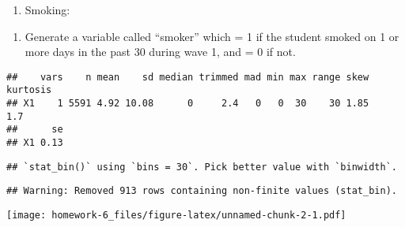\documentclass[]{article}
\newenvironment{Shaded}{\begin{snugshade}}{\end{snugshade}}
\newcommand{\DataTypeTok}[1]{\textcolor[rgb]{0.13,0.29,0.53}{#1}}
\newcommand{\KeywordTok}[1]{\textcolor[rgb]{0.13,0.29,0.53}{\textbf{#1}}}
\newcommand{\NormalTok}[1]{#1}
\newcommand{\OperatorTok}[1]{\textcolor[rgb]{0.81,0.36,0.00}{\textbf{#1}}}
\newcommand{\OtherTok}[1]{\textcolor[rgb]{0.56,0.35,0.01}{#1}}
\newcommand{\StringTok}[1]{\textcolor[rgb]{0.31,0.60,0.02}{#1}}
\providecommand{\tightlist}{%
  \setlength{\itemsep}{0pt}\setlength{\parskip}{0pt}}
\begin{document}
\begin{enumerate}
\def\labelenumi{\arabic{enumi})}
\setcounter{enumi}{2}
\tightlist
\item
  Smoking:
\end{enumerate}

\begin{enumerate}
\def\labelenumi{\alph{enumi}.}
\tightlist
\item
  Generate a variable called ``smoker'' which = 1 if the student smoked
  on 1 or more days in the past 30 during wave 1, and = 0 if not.
\end{enumerate}

\begin{Shaded}
\end{Shaded}

\begin{verbatim}
##    vars    n mean    sd median trimmed mad min max range skew kurtosis
## X1    1 5591 4.92 10.08      0     2.4   0   0  30    30 1.85      1.7
##      se
## X1 0.13
\end{verbatim}

\begin{Shaded}
\end{Shaded}

\begin{verbatim}
## `stat_bin()` using `bins = 30`. Pick better value with `binwidth`.
\end{verbatim}

\begin{verbatim}
## Warning: Removed 913 rows containing non-finite values (stat_bin).
\end{verbatim}

\texttt{[image: homework-6\_files/figure-latex/unnamed-chunk-2-1.pdf]}
\end{document}
